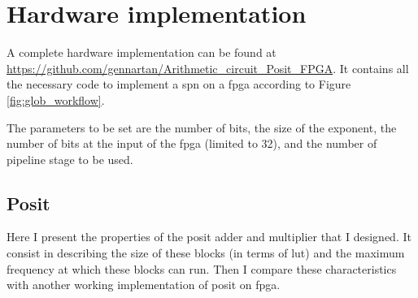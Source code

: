 \section{Hardware implementation}

A complete hardware implementation can be found at \url{https://github.com/gennartan/Arithmetic_circuit_Posit_FPGA}. It contains all the necessary code to implement a \gls{spn} on a \gls{fpga} according to Figure \ref{fig:glob_workflow}.

The parameters to be set are the number of bits, the size of the exponent, the number of bits at the input of the \gls{fpga} (limited to 32), and the number of pipeline stage to be used.


\subsection{Posit}

Here I present the properties of the posit adder and multiplier that I designed. It consist in describing the size of these blocks (in terms of \gls{lut}) and the maximum frequency at which these blocks can run. Then I compare these characteristics with another working implementation of posit on \gls{fpga}.

